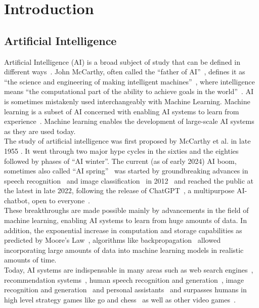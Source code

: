 \graphicspath{{img/intro/out}{img/intro}}

\chapter{Introduction}
\label{ch:intro}

\section{Artificial Intelligence}
\label{sec:artificial-intelligence}
Artificial Intelligence (AI) is a broad subject of study that can be defined in different ways~\cite[chapter 1]{russell_artificial_2021}.
John McCarthy, often called the “father of AI”~\cite{wiki_ai_2023, woo_fatherofai_2014, andresen_fatherofai_2002}, defines it as “the science and engineering of making intelligent machines”~\cite{stanford-whatisai}, where intelligence means “the computational part of the ability to achieve goals in the world”~\cite{stanford-whatisai}.
AI is sometimes mistakenly used interchangeably with Machine Learning.
Machine learning is a subset of AI concerned with enabling AI systems to learn from experience~\cite[chapter 1]{russell_artificial_2021}.
Machine learning enables the development of large-scale AI systems as they are used today.
\\
The study of artificial intelligence was first proposed by McCarthy et al. in late 1955 \cite{mccarthy_proposal_1955}.
It went through two major hype cycles in the sixties and the eighties~\cite{googlengram_ai, wiki_ai_2023, sitnflash_history_2017} followed by phases of “AI winter”.
The current (as of early 2024) AI boom, sometimes also called “AI spring”~\cite{aispring} was started by groundbreaking advances in speech recognition~\cite{hinton_deep_2012} and image classification~\cite{krizhevsky_imagenet_2012} in 2012~\cite{google_decade_2021, house_2012_2019} and reached the public at the latest in late 2022, following the release of ChatGPT~\cite{openai_chatgpt_intro}, a multipurpose AI-chatbot, open to everyone~\cite{openai_chatgpt}.
\\
These breakthroughs are made possible mainly by advancements in the field of machine learning, enabling AI systems to learn from huge amounts of data.
In addition, the exponential increase in computation and storage capabilities as predicted by Moore’s Law~\cite{mooreslaw}, algorithms like backpropagation~\cite{rumelhart_learning_1986} allowed incorporating large amounts of data into machine learning models in realistic amounts of time.
\\
Today, AI systems are indispensable in many areas such as web search engines~\cite{google_howweuseai}, recommendation systems~\cite{burke_recommender_2011}, human speech recognition and generation~\cite{elevenlabs, hinton_deep_2012}, image recognition and generation~\cite{midjourney, krizhevsky_imagenet_2012} and personal assistants~\cite{openai_chatgpt_intro} and surpasses humans in high level strategy games like go and chess~\cite{silver_mastering_2016, silver_mastering_2017} as well as other video games~\cite{piper_ai_2019}.


